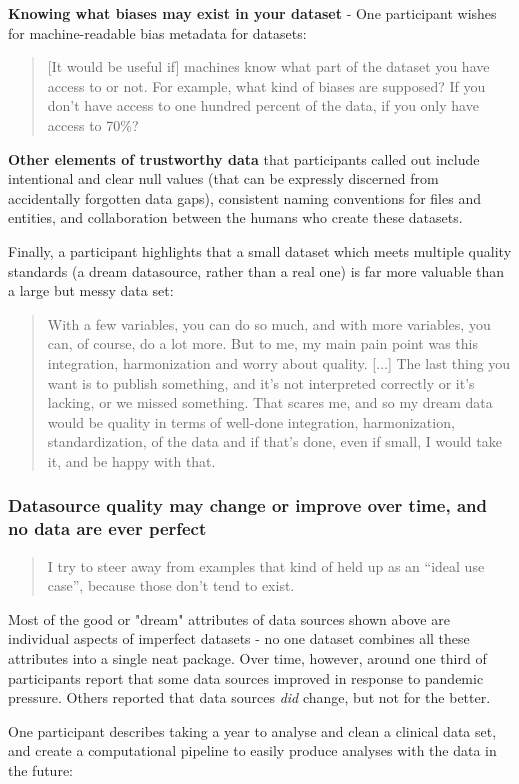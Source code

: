 \documentclass{CUP-JNL-DAP}%
\begin{document}
\textbf{Knowing what biases may exist in your dataset} - One participant wishes for machine-readable bias metadata for datasets: 

\blockquote{[It would be useful if] machines know what part of the dataset you have access to or not. For example, what kind of biases are supposed? If you don't have access to one hundred percent of the data, if you only have access to 70\%?}

\textbf{Other elements of trustworthy data} that participants called out include intentional and clear null values (that can be expressly discerned from accidentally forgotten data gaps), consistent naming conventions for files and entities, and collaboration between the humans who create these datasets.

Finally, a participant highlights that a small dataset which meets multiple quality standards (a dream datasource, rather than a real one) is far more valuable than a large but messy data set:

\blockquote{With a few variables, you can do so much, and with more variables, you can, of course, do a lot more. But to me, my main pain point was this integration, harmonization and worry about quality. [...] The last thing you want is to publish something, and it's not interpreted correctly or it's lacking, or we missed something. That scares me, and so my dream data would be quality in terms of well-done integration, harmonization, standardization, of the data and if that's done, even if small, I would take it, and be happy with that.}

\subsubsection{Datasource quality may change or improve over time, and no data are ever perfect}

\blockquote{I try to steer away from examples that kind of held up as an \enquote{ideal use case}, because those don't tend to exist.}

Most of the good or "dream" attributes of data sources shown above are individual aspects of imperfect datasets - no one dataset combines all these attributes into a single neat package. Over time, however, around one third of participants report that some data sources improved in response to pandemic pressure. Others reported that data sources \textit{did} change, but not for the better. 

One participant describes taking a year to analyse and clean a clinical data set, and create a computational pipeline to easily produce analyses with the data in the future: 
\end{document}
